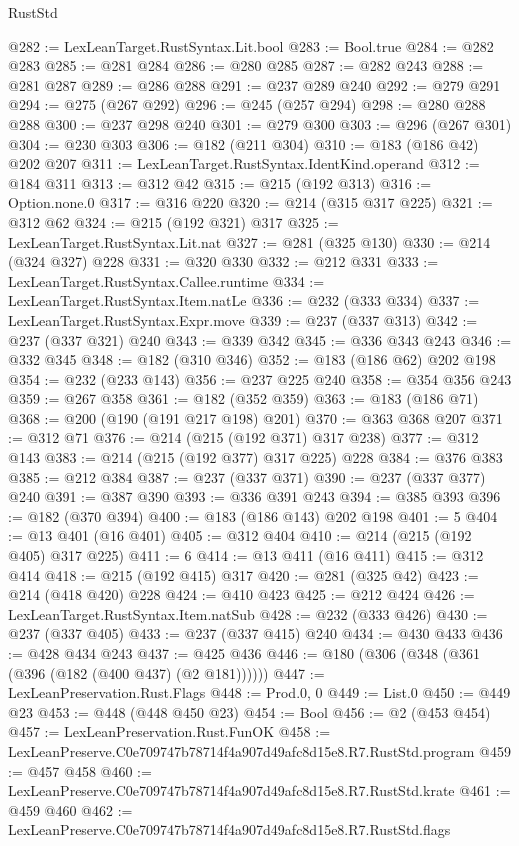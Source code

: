 \begin{lexlean}{RustStd}
\begin{coremodule}
@282 := LexLeanTarget.RustSyntax.Lit.bool
@283 := Bool.true
@284 := @282 @283
@285 := @281 @284
@286 := @280 @285
@287 := @282 @243
@288 := @281 @287
@289 := @286 @288
@291 := @237 @289 @240
@292 := @279 @291
@294 := @275 (@267 @292)
@296 := @245 (@257 @294)
@298 := @280 @288 @288
@300 := @237 @298 @240
@301 := @279 @300
@303 := @296 (@267 @301)
@304 := @230 @303
@306 := @182 (@211 @304)
@310 := @183 (@186 @42) @202 @207
@311 := LexLeanTarget.RustSyntax.IdentKind.operand
@312 := @184 @311
@313 := @312 @42
@315 := @215 (@192 @313)
@316 := Option.none.{0}
@317 := @316 @220
@320 := @214 (@315 @317 @225)
@321 := @312 @62
@324 := @215 (@192 @321) @317
@325 := LexLeanTarget.RustSyntax.Lit.nat
@327 := @281 (@325 @130)
@330 := @214 (@324 @327) @228
@331 := @320 @330
@332 := @212 @331
@333 := LexLeanTarget.RustSyntax.Callee.runtime
@334 := LexLeanTarget.RustSyntax.Item.natLe
@336 := @232 (@333 @334)
@337 := LexLeanTarget.RustSyntax.Expr.move
@339 := @237 (@337 @313)
@342 := @237 (@337 @321) @240
@343 := @339 @342
@345 := @336 @343 @243
@346 := @332 @345
@348 := @182 (@310 @346)
@352 := @183 (@186 @62) @202 @198
@354 := @232 (@233 @143)
@356 := @237 @225 @240
@358 := @354 @356 @243
@359 := @267 @358
@361 := @182 (@352 @359)
@363 := @183 (@186 @71)
@368 := @200 (@190 (@191 @217 @198) @201)
@370 := @363 @368 @207
@371 := @312 @71
@376 := @214 (@215 (@192 @371) @317 @238)
@377 := @312 @143
@383 := @214 (@215 (@192 @377) @317 @225) @228
@384 := @376 @383
@385 := @212 @384
@387 := @237 (@337 @371)
@390 := @237 (@337 @377) @240
@391 := @387 @390
@393 := @336 @391 @243
@394 := @385 @393
@396 := @182 (@370 @394)
@400 := @183 (@186 @143) @202 @198
@401 := 5
@404 := @13 @401 (@16 @401)
@405 := @312 @404
@410 := @214 (@215 (@192 @405) @317 @225)
@411 := 6
@414 := @13 @411 (@16 @411)
@415 := @312 @414
@418 := @215 (@192 @415) @317
@420 := @281 (@325 @42)
@423 := @214 (@418 @420) @228
@424 := @410 @423
@425 := @212 @424
@426 := LexLeanTarget.RustSyntax.Item.natSub
@428 := @232 (@333 @426)
@430 := @237 (@337 @405)
@433 := @237 (@337 @415) @240
@434 := @430 @433
@436 := @428 @434 @243
@437 := @425 @436
@446 := @180 (@306 (@348 (@361 (@396 (@182 (@400 @437) (@2 @181))))))
@447 := LexLeanPreservation.Rust.Flags
@448 := Prod.{0, 0}
@449 := List.{0}
@450 := @449 @23
@453 := @448 (@448 @450 @23)
@454 := Bool
@456 := @2 (@453 @454)
@457 := LexLeanPreservation.Rust.FunOK
@458 := LexLeanPreserve.C0e709747b78714f4a907d49afc8d15e8.R7.RustStd.program
@459 := @457 @458
@460 := LexLeanPreserve.C0e709747b78714f4a907d49afc8d15e8.R7.RustStd.krate
@461 := @459 @460
@462 := LexLeanPreserve.C0e709747b78714f4a907d49afc8d15e8.R7.RustStd.flags

\end{coremodule}
\end{lexlean}
